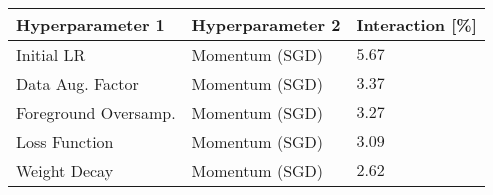\begin{tabular}{lll}
\toprule
Hyperparameter 1 & Hyperparameter 2 & Interaction [\%] \\
\midrule
Initial LR & Momentum (SGD) & $5.67$ \\
Data Aug. Factor & Momentum (SGD) & $3.37$ \\
Foreground Oversamp. & Momentum (SGD) & $3.27$ \\
Loss Function & Momentum (SGD) & $3.09$ \\
Weight Decay & Momentum (SGD) & $2.62$ \\
\bottomrule
\end{tabular}
